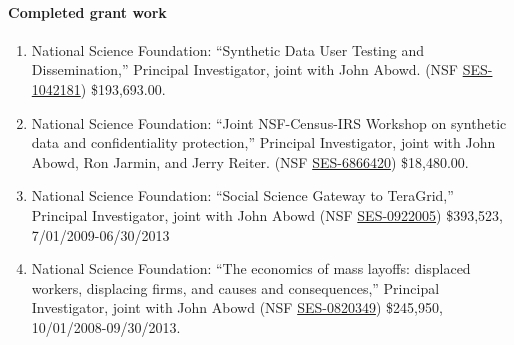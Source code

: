 \documentclass[12pt,letterpaper]{report}
\begin{document}
\paragraph{Completed grant work}
\begin{enumerate}
\item National Science Foundation: ``Synthetic Data User Testing and Dissemination,'' Principal Investigator, joint with John Abowd. (NSF \href{http://www.nsf.gov/awardsearch/showAward.do?AwardNumber=1042181}{SES-1042181}) \$193,693.00.

\item National Science Foundation: ``Joint NSF-Census-IRS Workshop on
  synthetic data and confidentiality protection,'' Principal Investigator, joint with John Abowd,
  Ron Jarmin, and Jerry Reiter. (NSF \href{http://www.nsf.gov/awardsearch/showAward.do?AwardNumber=6866420}{SES-6866420}) \$18,480.00.

\item National Science Foundation: ``Social Science Gateway to TeraGrid,''
Principal Investigator,  joint with John Abowd (NSF \href{http://www.nsf.gov/awardsearch/showAward.do?AwardNumber=0922005}{SES-0922005}) \$393,523,  7/01/2009-06/30/2013

\item National Science Foundation: ``The economics of mass layoffs:
  displaced workers, displacing firms, and causes and consequences,''
  Principal Investigator, joint
  with John Abowd (NSF \href{http://www.nsf.gov/awardsearch/showAward.do?AwardNumber=082034}{SES-0820349}) \$245,950,  10/01/2008-09/30/2013.


\end{enumerate}
\end{document}
